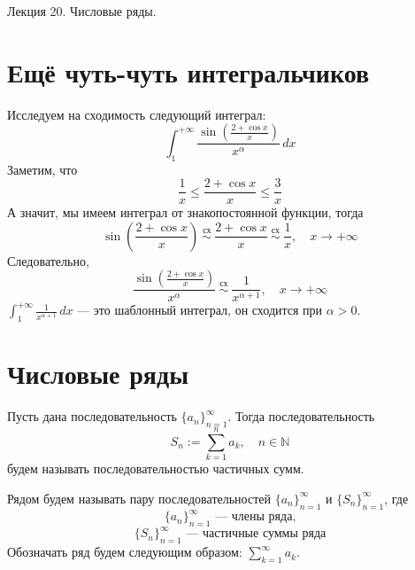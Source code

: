 \documentclass[11pt]{article}
\begin{document}
\begin{titlepage}
    \centering
    \vspace*{\fill}  %

    {\Huge Лекция 20. Числовые ряды. \par}

    \vspace*{\fill}  %
\end{titlepage}

\setcounter{page}{1}

\section{Ещё чуть-чуть интегральчиков}

\begin{example}
    Исследуем на сходимость следующий интеграл: \[\int_{1}^{+\infty}\frac{\sin\left(\frac{2 + \cos x}{x}\right)}{x^\alpha}\,dx\]
    Заметим, что \[\frac{1}{x} \leq \frac{2 + \cos x}{x} \leq \frac{3}{x}\]
    А значит, мы имеем интеграл от знакопостоянной функции, тогда
    \[\sin\left(\frac{2 + \cos x}{x}\right) \ \overset{\text{сх}}{\sim} \ \frac{2 + \cos x}{x} \ \overset{\text{сх}}{\sim} \ \frac{1}{x}, \quad x \to +\infty\]
    Следовательно, \[ \frac{\sin\left(\frac{2 + \cos x}{x}\right)}{x^\alpha} \ \overset{\text{сх}}{\sim} \ \frac{1}{x^{\alpha + 1}}, \quad x \to +\infty\]
    $\displaystyle \int_{1}^{+\infty} \frac{1}{x^{\alpha + 1}}\,dx$ --- это шаблонный интеграл, он сходится при $\alpha > 0$.
\end{example}

\section{Числовые ряды}

\begin{definition}
    Пусть дана последовательность $\{a_n\}_{n = 1}^{\infty}$. Тогда последовательность
    \[S_n := \sum_{k = 1}^{n} a_k, \quad n \in \mathbb{N}\] будем называть последовательностью
    частичных сумм.
\end{definition}

\begin{definition}
    Рядом будем называть пару последовательностей $\{a_n\}_{n = 1}^{\infty}$ и 
    $\{S_n\}_{n = 1}^{\infty}$, где \[\{a_n\}_{n = 1}^{\infty} \text{ --- члены ряда,}\]
    \[\{S_n\}_{n = 1}^{\infty} \text{ --- частичные суммы ряда}\]
    Обозначать ряд будем следующим образом: $\displaystyle \sum_{k = 1}^{\infty} a_k$.
\end{definition}
\end{document}

